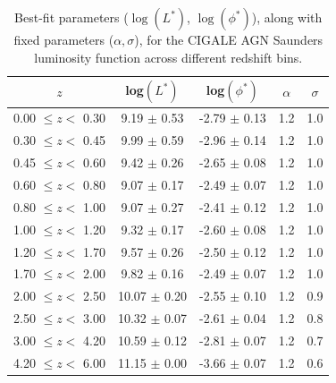 \begin{table}[h]
    \caption{Best-fit parameters ($\log(L^*)$, $\log(\phi^*)$), along with fixed parameters ($\alpha, \sigma$), for the CIGALE AGN Saunders luminosity function across different redshift bins.}
    \label{Tab: Param Evo AGN}
    \begin{center}
    \begin{tabular}{ccccc}
        \toprule
        $z$ & log$(L^{*})$ & log$(\phi^{*})$ & $\alpha$ & $\sigma$ \\
        \hline
        0.00 $\leq z <$ 0.30 &  9.19 $\pm$ 0.53 & -2.79 $\pm$ 0.13 & 1.2 & 1.0 \\
        0.30 $\leq z <$ 0.45 &  9.99 $\pm$ 0.59 & -2.96 $\pm$ 0.14 & 1.2 & 1.0 \\
        0.45 $\leq z <$ 0.60 &  9.42 $\pm$ 0.26 & -2.65 $\pm$ 0.08 & 1.2 & 1.0 \\
        0.60 $\leq z <$ 0.80 &  9.07 $\pm$ 0.17 & -2.49 $\pm$ 0.07 & 1.2 & 1.0 \\
        0.80 $\leq z <$ 1.00 &  9.07 $\pm$ 0.27 & -2.41 $\pm$ 0.12 & 1.2 & 1.0 \\
        1.00 $\leq z <$ 1.20 &  9.32 $\pm$ 0.17 & -2.60 $\pm$ 0.08 & 1.2 & 1.0 \\
        1.20 $\leq z <$ 1.70 &  9.57 $\pm$ 0.26 & -2.50 $\pm$ 0.12 & 1.2 & 1.0 \\
        1.70 $\leq z <$ 2.00 &  9.82 $\pm$ 0.16 & -2.49 $\pm$ 0.07 & 1.2 & 1.0 \\
        2.00 $\leq z <$ 2.50 & 10.07 $\pm$ 0.20 & -2.55 $\pm$ 0.10 & 1.2 & 0.9 \\
        2.50 $\leq z <$ 3.00 & 10.32 $\pm$ 0.07 & -2.61 $\pm$ 0.04 & 1.2 & 0.8 \\
        3.00 $\leq z <$ 4.20 & 10.59 $\pm$ 0.12 & -2.81 $\pm$ 0.07 & 1.2 & 0.7 \\
        4.20 $\leq z <$ 6.00 & 11.15 $\pm$ 0.00 & -3.66 $\pm$ 0.07 & 1.2 & 0.6      
        \botrule
    \end{tabular}
    \end{center}
\end{table}


